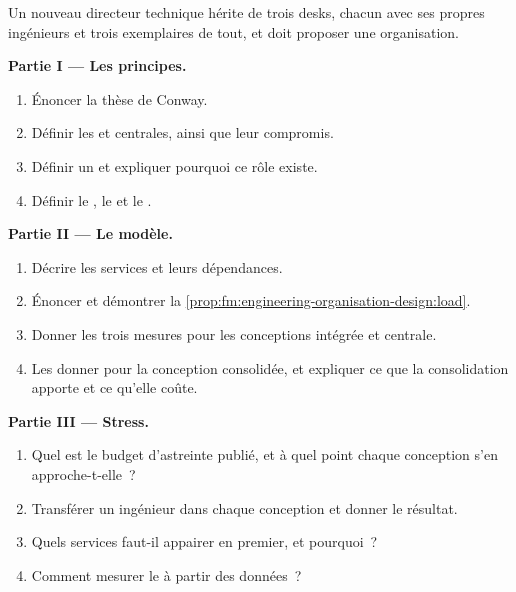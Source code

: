 \begin{problem}\label{pb:fm:engineering-organisation-design:1}
Un nouveau directeur technique hérite de trois desks, chacun avec ses propres ingénieurs et trois exemplaires de tout, et doit proposer une organisation.

\medskip\noindent\textbf{Partie I --- Les principes.}
\begin{enumerate}
\item Énoncer la thèse de Conway.
\item Définir les  et centrales, ainsi que leur compromis.
\item Définir un  et expliquer pourquoi ce rôle existe.
\item Définir le , le  et le .
\end{enumerate}

\medskip\noindent\textbf{Partie II --- Le modèle.}
\begin{enumerate}[resume]
\item Décrire les services et leurs dépendances.
\item Énoncer et démontrer la \cref{prop:fm:engineering-organisation-design:load}.
\item Donner les trois mesures pour les conceptions intégrée et centrale.
\item Les donner pour la conception consolidée, et expliquer ce que la consolidation apporte et ce qu'elle coûte.
\end{enumerate}

\medskip\noindent\textbf{Partie III --- Stress.}
\begin{enumerate}[resume]
\item Quel est le budget d'astreinte publié, et à quel point chaque conception s'en approche-t-elle~?
\item Transférer un ingénieur dans chaque conception et donner le résultat.
\item Quels services faut-il appairer en premier, et pourquoi~?
\item Comment mesurer le  à partir des données~?
\end{enumerate}


\end{problem}
